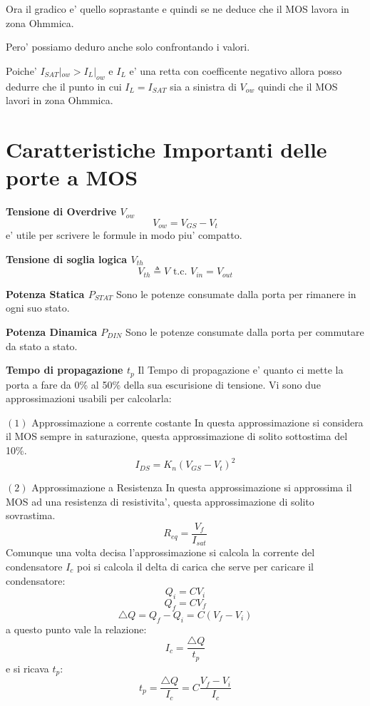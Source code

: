 \documentclass[\main/main.tex]{subfiles}
\begin{document}
Ora il gradico e' quello soprastante e quindi se ne deduce che il MOS lavora in zona Ohmmica.

Pero' possiamo deduro anche solo confrontando i valori.

Poiche' $I_{SAT}|_{ow} > I_{L}|_{ow}$ e $I_L$ e' una retta con coefficente negativo allora posso dedurre che il punto in cui $I_L = I_{SAT}$ sia a sinistra di $V_{ow}$ quindi che il MOS lavori in zona Ohmmica.

\clearpage
\section{Caratteristiche Importanti delle porte a MOS}
\textbf{Tensione di Overdrive $V_{ow}$}
\[ V_{ow} = V_{GS} - V_t\]
e' utile per scrivere le formule in modo piu' compatto.

\textbf{Tensione di soglia logica $V_{th}$}
\[V_{th} \triangleq V \text{ t.c. } V_{in} = V_{out}\]

\textbf{Potenza Statica $P_{STAT}$}
Sono le potenze consumate dalla porta per rimanere in ogni suo stato.

\textbf{Potenza Dinamica $P_{DIN}$}
Sono le potenze consumate dalla porta per commutare da stato a stato.

\textbf{Tempo di propagazione $t_p$}
Il Tempo di propagazione e' quanto ci mette la porta a fare da 0\% al 50\% della sua escurisione di tensione.
Vi sono due approssimazioni usabili per calcolarla:

$(1)$ Approssimazione a corrente costante
In questa approssimazione si considera il MOS sempre in saturazione, questa approssimazione di solito sottostima del 10\%.
\[ I_{DS} = K_n \left( V_{GS} - V_t \right)^2\]

$(2)$ Approssimazione a Resistenza
In questa approssimazione si approssima il MOS ad una resistenza di resistivita', questa approssimazione di solito sovrastima.
\[R_{eq} = \frac{V_f}{I_{sat}} \]
Comunque una volta decisa l'approssimazione si calcola la corrente del condensatore $I_c$ poi si calcola il delta di carica che serve per caricare il condensatore:
\[Q_i = C V_i\]
\[Q_f = C V_f\]
\[\bigtriangleup Q = Q_f - Q_i = C \left( V_f - V_i\right) \]
a questo punto vale la relazione:
\[I_c = \frac{\bigtriangleup Q}{t_p}\]
e si ricava $t_p$:
\[t_p = \frac{\bigtriangleup Q}{I_c} = C \frac{V_f - V_i}{I_c}\]
\end{document}
